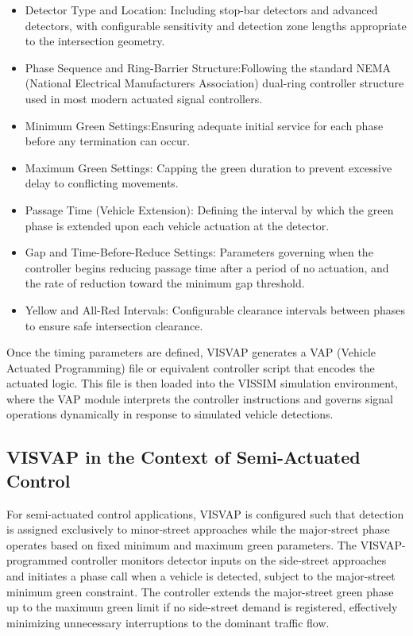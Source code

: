 \begin{itemize}
    \item Detector Type and Location: Including stop-bar 
    detectors and advanced detectors, with configurable 
    sensitivity and detection zone lengths appropriate to 
    the intersection geometry.

    \item Phase Sequence and Ring-Barrier Structure:Following the standard NEMA (National Electrical 
    Manufacturers Association) dual-ring controller 
    structure used in most modern actuated signal controllers.

    \item Minimum Green Settings:Ensuring adequate 
    initial service for each phase before any termination 
    can occur.

    \item Maximum Green Settings: Capping the green duration 
    to prevent excessive delay to conflicting movements.

    \item Passage Time (Vehicle Extension): Defining the 
    interval by which the green phase is extended upon each 
    vehicle actuation at the detector.

    \item Gap and Time-Before-Reduce Settings: Parameters 
    governing when the controller begins reducing passage 
    time after a period of no actuation, and the rate of 
    reduction toward the minimum gap threshold.

    \item Yellow and All-Red Intervals: Configurable 
    clearance intervals between phases to ensure safe 
    intersection clearance.

\end{itemize}

Once the timing parameters are defined, VISVAP generates a 
VAP (Vehicle Actuated Programming) file or equivalent 
controller script that encodes the actuated logic. This 
file is then loaded into the VISSIM simulation environment, 
where the VAP module interprets the controller instructions 
and governs signal operations dynamically in response to 
simulated vehicle detections.


\subsection{VISVAP in the Context of Semi-Actuated Control}

For semi-actuated control applications, VISVAP is configured 
such that detection is assigned exclusively to minor-street 
approaches while the major-street phase operates based on 
fixed minimum and maximum green parameters. The 
VISVAP-programmed controller monitors detector inputs on the 
side-street approaches and initiates a phase call when a 
vehicle is detected, subject to the major-street minimum 
green constraint. The controller extends the major-street 
green phase up to the maximum green limit if no side-street 
demand is registered, effectively minimizing unnecessary 
interruptions to the dominant traffic flow.

